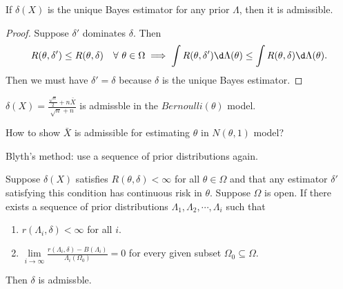 \documentclass[a4paper]{article}
\begin{document}
\begin{prop}
	If $\delta(X)$ is the unique Bayes estimator for any prior $\Lambda$, then it is admissible.
\end{prop}

\begin{proof}
	Suppose $\delta'$ dominates $\delta$. Then
	\begin{equation}
		R(\theta,\delta') \leq R(\theta,\delta) \quad \forall \ \theta \in \Omega \implies \int R(\theta,\delta') \d \Lambda (\theta) \leq \int R(\theta,\delta) \d \Lambda (\theta).
	\end{equation}
	Then we must have $\delta' = \delta$ because $\delta$ is the unique Bayes estimator.
\end{proof}

\begin{eg}
	$\delta(X) = \frac{\frac{\sqrt{n}}{2} + n \bar{X}}{\sqrt{n} + n}$ is admissble in the $Bernoulli(\theta)$ model.
\end{eg}

\begin{question}
	How to show $\bar{X}$ is admissible for estimating $\theta$ in $N(\theta,1)$ model?
\end{question}

\begin{answer}
	Blyth's method: use a sequence of prior distributions again.
\end{answer}

\begin{thm}
	Suppose $\delta(X)$ satisfies $R(\theta,\delta) < \infty$ for all $\theta \in \Omega$ and that any estimator $\delta'$ satisfying this condition has continuous risk in $\theta$. Suppose $\Omega$ is open. If there exists a sequence of prior distributions $\Lambda_1,\Lambda_2,\cdots,\Lambda_i$ such that
	\begin{enumerate}
		\item $r(\Lambda_i,\delta) < \infty$ for all $i$.
		\item $\lim\limits_{i \to \infty} \frac{r(\Lambda_i,\delta) - B(\Lambda_i)}{\Lambda_i(\Omega_0)} = 0$ for every given subset $\Omega_0 \subseteq \Omega$.
	\end{enumerate}
	Then $\delta$ is admissble.
\end{thm}
\end{document}
